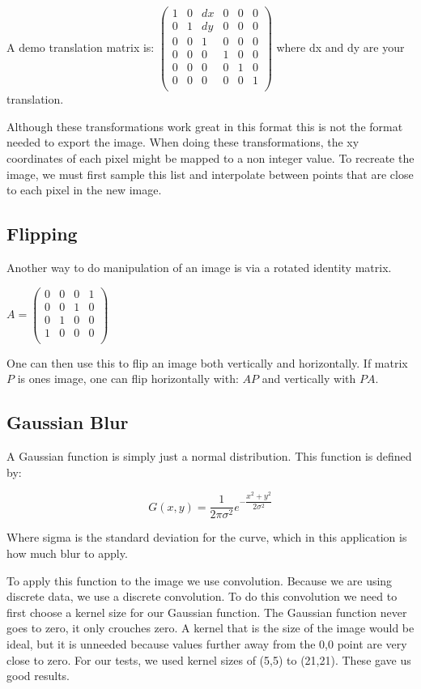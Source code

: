 \documentclass[11pt]{article}
\begin{document}
A demo translation matrix is:
  $\begin{pmatrix}
	1 & 0 & dx & 0 & 0 & 0\\
	0 & 1 & dy & 0 & 0 & 0\\
	0 & 0 & 1 & 0 & 0 & 0\\
	0 & 0 & 0 & 1 & 0 & 0\\
	0 & 0 & 0 & 0 & 1 & 0\\
	0 & 0 & 0 & 0 & 0 & 1\\
\end{pmatrix}$
where dx and dy are your translation.

Although these transformations work great in this format this is not the format needed to export the image. When doing these transformations, the xy coordinates of each pixel might be mapped to a non integer value. To recreate the image, we must first sample this list and interpolate between points that are close to each pixel in the new image.


\subsection{Flipping}
Another way to do manipulation of an image is via a rotated identity matrix. 

$A = \begin{pmatrix}
	0 & 0 & 0 & 1\\
	0 & 0 & 1 & 0\\
	0 & 1 & 0 & 0\\
	1 & 0 & 0 & 0\\
\end{pmatrix}$

One can then use this to flip an image both vertically and horizontally.
If matrix $P$ is ones image, one can flip horizontally with:
$A P$ and vertically with $P A$. 


\subsection{Gaussian Blur}
A Gaussian function is simply just a normal distribution. This function is defined by:

$$
G(x,y) = \dfrac{1}{2\pi \sigma^2}e^{-\dfrac{x^2+y^2}{2 \sigma^2}}$$

Where sigma is the standard deviation for the curve, which in this application is how much blur to apply.

To apply this function to the image we use convolution. Because we are using discrete data, we use a discrete convolution. To do this convolution we need to first choose a kernel size for our Gaussian function. The Gaussian function never goes to zero, it only crouches zero. A kernel that is the size of the image would be ideal, but it is unneeded because values further away from the 0,0 point are very close to zero. For our tests, we used kernel sizes of (5,5) to (21,21). These gave us good results. 
\end{document}
